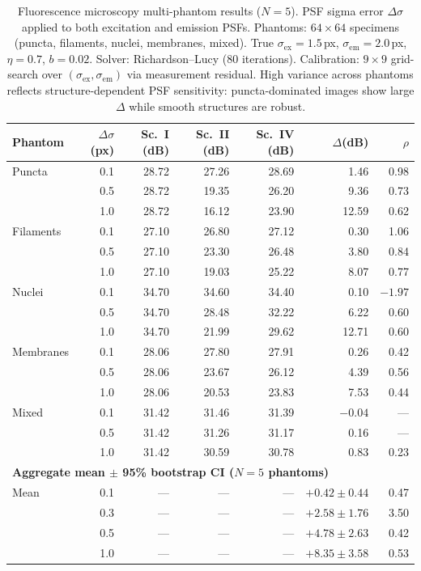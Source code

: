\documentclass[11pt]{article}
\theoremstyle{definition}
\begin{document}
\begin{table}[htbp]
\centering
\caption{Fluorescence microscopy multi-phantom results ($N{=}5$). PSF sigma error $\Delta\sigma$ applied to both excitation and emission PSFs.
Phantoms: $64 \times 64$ specimens (puncta, filaments, nuclei, membranes, mixed).
True $\sigma_{\mathrm{ex}}{=}1.5$\,px, $\sigma_{\mathrm{em}}{=}2.0$\,px, $\eta{=}0.7$, $b{=}0.02$.
Solver: Richardson--Lucy (80 iterations). Calibration: $9 \times 9$ grid-search over $(\sigma_{\mathrm{ex}}, \sigma_{\mathrm{em}})$ via measurement residual.
High variance across phantoms reflects structure-dependent PSF sensitivity: puncta-dominated images show large $\Delta$ while smooth structures are robust.}
\label{tab:fluor_scenes}
\small
\begin{tabular}{l r r r r r r}
\toprule
Phantom & $\Delta\sigma$ (px) & Sc.~I (dB) & Sc.~II (dB) & Sc.~IV (dB) & $\Delta$(dB) & $\rho$ \\
\midrule
Puncta       & 0.1 & 28.72 & 27.26 & 28.69 &  1.46 & 0.98 \\
             & 0.5 & 28.72 & 19.35 & 26.20 &  9.36 & 0.73 \\
             & 1.0 & 28.72 & 16.12 & 23.90 & 12.59 & 0.62 \\
Filaments    & 0.1 & 27.10 & 26.80 & 27.12 &  0.30 & 1.06 \\
             & 0.5 & 27.10 & 23.30 & 26.48 &  3.80 & 0.84 \\
             & 1.0 & 27.10 & 19.03 & 25.22 &  8.07 & 0.77 \\
Nuclei       & 0.1 & 34.70 & 34.60 & 34.40 &  0.10 & $-1.97$ \\
             & 0.5 & 34.70 & 28.48 & 32.22 &  6.22 & 0.60 \\
             & 1.0 & 34.70 & 21.99 & 29.62 & 12.71 & 0.60 \\
Membranes    & 0.1 & 28.06 & 27.80 & 27.91 &  0.26 & 0.42 \\
             & 0.5 & 28.06 & 23.67 & 26.12 &  4.39 & 0.56 \\
             & 1.0 & 28.06 & 20.53 & 23.83 &  7.53 & 0.44 \\
Mixed        & 0.1 & 31.42 & 31.46 & 31.39 & $-0.04$ & --- \\
             & 0.5 & 31.42 & 31.26 & 31.17 &  0.16 & --- \\
             & 1.0 & 31.42 & 30.59 & 30.78 &  0.83 & 0.23 \\
\midrule
\multicolumn{7}{l}{\textbf{Aggregate mean $\pm$ 95\% bootstrap CI ($N{=}5$ phantoms)}} \\
\midrule
Mean   & 0.1 & --- & --- & --- & $+0.42 \pm 0.44$ & 0.47 \\
       & 0.3 & --- & --- & --- & $+2.58 \pm 1.76$ & 3.50 \\
       & 0.5 & --- & --- & --- & $+4.78 \pm 2.63$ & 0.42 \\
       & 1.0 & --- & --- & --- & $+8.35 \pm 3.58$ & 0.53 \\
\bottomrule
\end{tabular}
\end{table}
\end{document}
